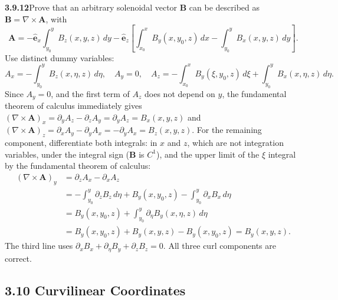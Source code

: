 \par\bigskip
\noindent\textbf{3.9.12}\quad Prove that an arbitrary solenoidal vector
$\mathbf{B}$ can be described as $\mathbf{B}=\nabla\times\mathbf{A}$, with
\[
\mathbf{A}=-\hat{\mathbf{e}}_{x}\int_{y_{0}}^{y}B_{z}(x,y,z)\,dy
-\hat{\mathbf{e}}_{z}\left[\int_{x_{0}}^{x}B_{y}(x,y_{0},z)\,dx
-\int_{y_{0}}^{y}B_{x}(x,y,z)\,dy\right].
\]
\solution
{}
Use distinct dummy variables:
\[
A_x=-\int_{y_0}^yB_z(x,\eta,z)\,d\eta,\quad A_y=0,\quad
A_z=-\int_{x_0}^xB_y(\xi,y_0,z)\,d\xi
+\int_{y_0}^yB_x(x,\eta,z)\,d\eta.
\]
Since $A_y=0$, and the first term of $A_z$ does not depend on $y$,
the fundamental theorem of calculus immediately gives
$(\nabla\times\mathbf A)_x=\partial_yA_z-\partial_zA_y
=\partial_yA_z=B_x(x,y,z)$ and
$(\nabla\times\mathbf A)_z=\partial_xA_y-\partial_yA_x
=-\partial_yA_x=B_z(x,y,z)$.
For the remaining component, differentiate both integrals: in $x$ and
$z$, which are not integration variables, under the integral sign
($\mathbf B$ is $C^1$), and the upper limit of the $\xi$ integral by the
fundamental theorem of calculus:
\[
\begin{aligned}
(\nabla\times\mathbf A)_y
&=\partial_zA_x-\partial_xA_z\\
&=-\int_{y_0}^y\partial_zB_z\,d\eta+B_y(x,y_0,z)
-\int_{y_0}^y\partial_xB_x\,d\eta\\
&=B_y(x,y_0,z)+\int_{y_0}^y\partial_\eta B_y(x,\eta,z)\,d\eta\\
&=B_y(x,y_0,z)+B_y(x,y,z)-B_y(x,y_0,z)=B_y(x,y,z).
\end{aligned}
\]
The third line uses $\partial_xB_x+\partial_\eta B_y+\partial_zB_z=0$.
All three curl components are correct.

\subsection*{3.10 Curvilinear Coordinates}


